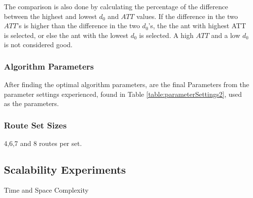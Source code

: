 The comparison is also done by calculating the percentage of the difference between the highest and lowest $d_0$ and $ATT$ values. If the difference in the two $ATT$'s is higher than the difference in the two $d_0$'s, the the ant with highest ATT is selected, or else the ant with the lowest $d_0$ is selected. A high $ATT$ and a low $d_0$ is not considered good. 

\subsubsection{Algorithm Parameters}
After finding the optimal algorithm parameters, are the final Parameters from the parameter settings experienced, found in Table \vref{table:parameterSettings2}, used as the parameters.

\subsubsection{Route Set Sizes}
4,6,7 and 8 routes per set.

\subsection{Scalability Experiments}
Time and Space Complexity
